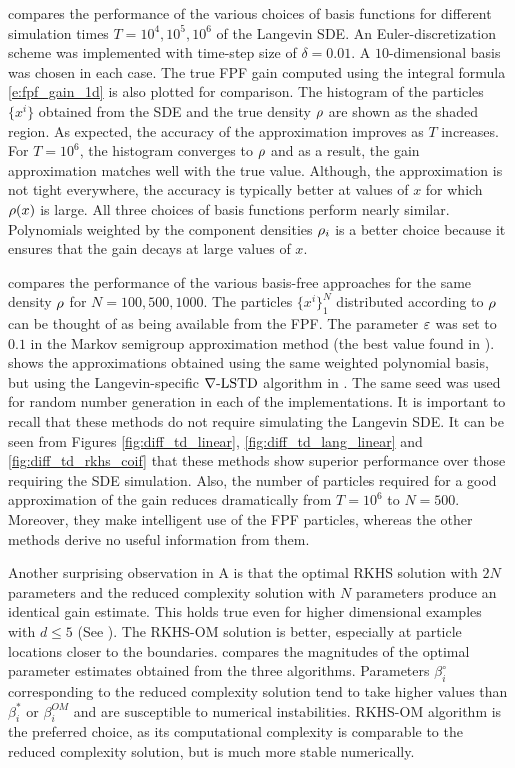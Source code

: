  compares the performance of the various choices of basis functions for different simulation times $T = 10^4, 10^5, 10^6$ of the Langevin SDE. An Euler-discretization scheme was implemented with time-step size of $\delta = 0.01$. A $10$-dimensional basis was chosen in each case. The true FPF gain computed using the integral formula \eqref{e:fpf_gain_1d} is also plotted for comparison. The histogram of the particles $\{x^i\}$ obtained from the SDE and the true density $\rho$ are shown as the shaded region. As expected, the accuracy of the approximation improves as $T$ increases. For $T=10^6$, the histogram converges to $\rho$ and as a result, the gain approximation matches well with the true value. Although, the approximation is not tight everywhere, the accuracy is typically better at values of $x$ for which $\rho(x)$ is large. All three choices of basis functions perform nearly similar. Polynomials weighted by the component densities $\rho_i$ is a better choice because it ensures that the gain decays at large values of $x$. 

 compares the performance of the various basis-free approaches for the same density $\rho$ for $N = 100,500,1000$. The particles $\{x^i\}_1^N$ distributed according to $\rho$ can be thought of as being available from the FPF. The parameter $\varepsilon$ was set to $0.1$ in the Markov semigroup approximation method (the best value found in \cite{tagmeh16a}).  shows the approximations obtained using the same weighted polynomial basis, but using the Langevin-specific $\nabla\text{-LSTD}$ algorithm in . The same seed was used for random number generation in each of the implementations. It is important to recall that these methods do not require simulating the Langevin SDE. It can be seen from Figures \ref{fig:diff_td_linear}, \ref{fig:diff_td_lang_linear} and \ref{fig:diff_td_rkhs_coif} that these methods show superior performance over those requiring the SDE simulation. Also, the number of particles required for a good approximation of the gain reduces dramatically from $T=10^6$ to $N=500$. Moreover, they make intelligent use of the FPF particles, whereas the other methods derive no useful information from them.   

Another surprising observation in  A is that the optimal RKHS solution with $2N$ parameters and the reduced complexity solution with $N$ parameters produce an identical gain estimate. This holds true even for higher dimensional examples with $d\leq 5$ (See ). The RKHS-OM solution is better, especially at particle locations closer to the boundaries.  compares the magnitudes of the optimal parameter estimates obtained from the three algorithms. Parameters $\beta_i^\circ$ corresponding to the reduced complexity solution tend to take higher values than $\beta_i^*$ or $\beta_i^{OM}$ and are susceptible to numerical instabilities. RKHS-OM algorithm is the preferred choice, as its computational complexity is comparable to the reduced complexity solution, but is much more stable numerically. 

